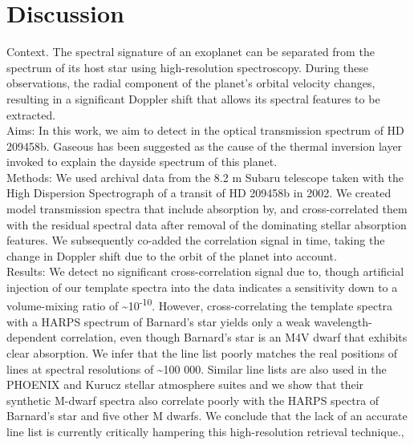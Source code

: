 
\section{Discussion}
\label{sec:chisquared_discussion}

\citet{hoeijmakers_search_2015}
{Context.
    The spectral signature of an exoplanet can be separated from the spectrum of its host star using high-resolution spectroscopy.
    During these observations, the radial component of the planet's orbital velocity changes, resulting in a significant Doppler shift that allows its spectral features to be extracted.\\
    Aims: In this work, we aim to detect in the optical transmission spectrum of HD 209458b.
    Gaseous has been suggested as the cause of the thermal inversion layer invoked to explain the dayside spectrum of this planet.\\
    Methods: We used archival data from the 8.2 m Subaru telescope taken with the High Dispersion Spectrograph of a transit of HD 209458b in 2002.
    We created model transmission spectra that include absorption by, and cross-correlated them with the residual spectral data after removal of the dominating stellar absorption features.
    We subsequently co-added the correlation signal in time, taking the change in Doppler shift due to the orbit of the planet into account.\\
    Results: We detect no significant cross-correlation signal due to, though artificial injection of our template spectra into the data indicates a sensitivity down to a volume-mixing ratio of \textasciitilde{}10\textsuperscript{-10}.
    However, cross-correlating the template spectra with a {HARPS} spectrum of Barnard's star yields only a weak wavelength-dependent correlation, even though Barnard's star is an M4V dwarf that exhibits clear  absorption.
    We infer that the line list poorly matches the real positions of lines at spectral resolutions of \textasciitilde{}100 000.
    Similar line lists are also used in the {PHOENIX} and Kurucz stellar atmosphere suites and we show that their synthetic M-dwarf spectra also correlate poorly with the {HARPS} spectra of Barnard's star and five other M dwarfs.
    We conclude that the lack of an accurate line list is currently critically hampering this high-resolution retrieval technique.},




